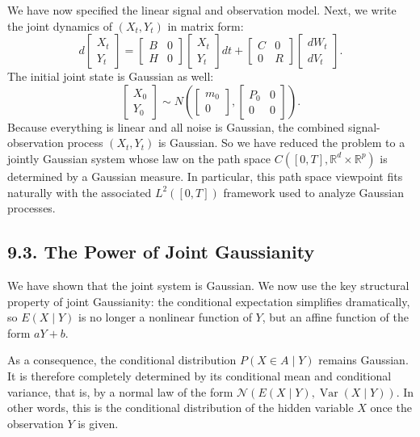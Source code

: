\documentclass[11pt]{article}
\theoremstyle{definition}
\theoremstyle{remark}
\begin{document}
We have now specified the linear signal and observation model. Next, we write the joint dynamics of $(X_t,Y_t)$ in matrix form:
\[
d
\begin{bmatrix}
X_t\\
Y_t
\end{bmatrix}
=
\begin{bmatrix}
B&0\\
H&0
\end{bmatrix}
\begin{bmatrix}
X_t\\
Y_t
\end{bmatrix}dt
+
\begin{bmatrix}
C&0\\
0&R
\end{bmatrix}
\begin{bmatrix}
dW_t\\
dV_t
\end{bmatrix}.
\]
The initial joint state is Gaussian as well:
\[
\begin{bmatrix}
X_0\\
Y_0
\end{bmatrix}
\sim
N\left(
\begin{bmatrix}
m_0\\
0
\end{bmatrix},
\begin{bmatrix}
P_0&0\\
0&0
\end{bmatrix}
\right).
\]
Because everything is linear and all noise is Gaussian, the combined signal-observation process $(X_t,Y_t)$ is Gaussian. So we have reduced the problem to a jointly Gaussian system whose law on the path space $C([0,T],\mathbb R^d\times\mathbb R^p)$ is determined by a Gaussian measure. In particular, this path space viewpoint fits naturally with the associated $L^2([0,T])$ framework used to analyze Gaussian processes.

\subsection*{9.3. The Power of Joint Gaussianity}
We have shown that the joint system is Gaussian. We now use the key structural property of joint Gaussianity: the conditional expectation simplifies dramatically, so $E(X\mid Y)$ is no longer a nonlinear function of $Y$, but an affine function of the form $aY+b$.

As a consequence, the conditional distribution $P(X\in A\mid Y)$ remains Gaussian. It is therefore completely determined by its conditional mean and conditional variance, that is, by a normal law of the form $\mathcal N(E(X\mid Y),\operatorname{Var}(X\mid Y))$.
In other words, this is the conditional distribution of the hidden variable $X$ once the observation $Y$ is given.
\end{document}
